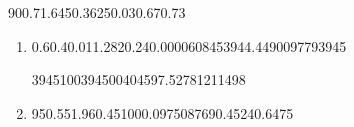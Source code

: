 
\begin{question}

    \begin{formula3} 
        {90}{0.7}{1.645}{0.3}{625}{0.03}{0.67}{0.73}
    \end{formula3}
    
\end{question}


\begin{question}
    
    \begin{enumerate}[label={\textbf{\alph*)}}]

        \item 
            
            \begin{formula4}
                {0.6}{0.4}{0.01}{1.282}{0.24}{0.000060845}{3944.449009779}{3945}
            \end{formula4}

            \begin{formula5}
                {3945}{100}{394500}{4045}{97.527812114}{98}
            \end{formula5}
        
        \item 
            
            \begin{formula3}
                {95}{0.55}{1.96}{0.45}{100}{0.097508769}{0.4524}{0.6475}
            \end{formula3}

    \end{enumerate}
\end{question}


